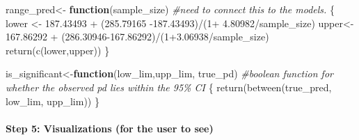 \documentclass[
]{article}
\newenvironment{Shaded}{\begin{snugshade}}{\end{snugshade}}
\newcommand{\CommentTok}[1]{\textcolor[rgb]{0.56,0.35,0.01}{\textit{#1}}}
\newcommand{\ControlFlowTok}[1]{\textcolor[rgb]{0.13,0.29,0.53}{\textbf{#1}}}
\newcommand{\DecValTok}[1]{\textcolor[rgb]{0.00,0.00,0.81}{#1}}
\newcommand{\FloatTok}[1]{\textcolor[rgb]{0.00,0.00,0.81}{#1}}
\newcommand{\FunctionTok}[1]{\textcolor[rgb]{0.00,0.00,0.00}{#1}}
\newcommand{\NormalTok}[1]{#1}
\newcommand{\OtherTok}[1]{\textcolor[rgb]{0.56,0.35,0.01}{#1}}
\newcommand{\SpecialCharTok}[1]{\textcolor[rgb]{0.00,0.00,0.00}{#1}}
\begin{document}
\begin{Shaded}
\begin{Highlighting}[]
\NormalTok{range\_pred}\OtherTok{\textless{}{-}} \ControlFlowTok{function}\NormalTok{(sample\_size) }\CommentTok{\#need to connect this to the models. }
\NormalTok{\{}
\NormalTok{  lower }\OtherTok{\textless{}{-}} \FloatTok{187.43493} \SpecialCharTok{+}\NormalTok{ (}\FloatTok{285.79165} \SpecialCharTok{{-}}\FloatTok{187.43493}\NormalTok{)}\SpecialCharTok{/}\NormalTok{(}\DecValTok{1}\SpecialCharTok{+} \FloatTok{4.80982}\SpecialCharTok{/}\NormalTok{sample\_size)}
\NormalTok{  upper}\OtherTok{\textless{}{-}} \FloatTok{167.86292} \SpecialCharTok{+}\NormalTok{ (}\FloatTok{286.30946{-}167.86292}\NormalTok{)}\SpecialCharTok{/}\NormalTok{(}\DecValTok{1}\FloatTok{+3.06938}\SpecialCharTok{/}\NormalTok{sample\_size)}
  \FunctionTok{return}\NormalTok{(}\FunctionTok{c}\NormalTok{(lower,upper))}
\NormalTok{\}}

\NormalTok{is\_significant}\OtherTok{\textless{}{-}}\ControlFlowTok{function}\NormalTok{(low\_lim,upp\_lim, true\_pd) }\CommentTok{\#boolean function for whether the observed pd lies within the 95\% CI}
\NormalTok{\{}
  \FunctionTok{return}\NormalTok{(}\FunctionTok{between}\NormalTok{(true\_pred, low\_lim, upp\_lim))}
\NormalTok{\}}
\end{Highlighting}
\end{Shaded}

\hypertarget{step-5-visualizations-for-the-user-to-see}{%
\paragraph{Step 5: Visualizations (for the user to
see)}\label{step-5-visualizations-for-the-user-to-see}}
\end{document}
